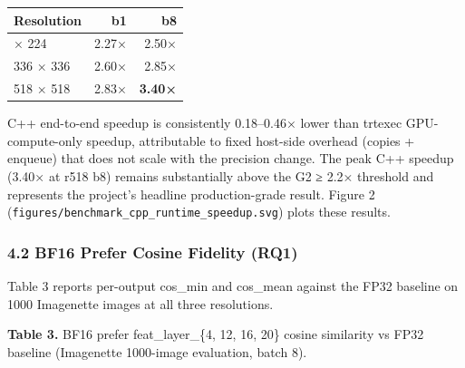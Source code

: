 \documentclass[
]{article}
\newcounter{none} %
\begin{document}
{\def\LTcaptype{none} %
\begin{longtable}[]{@{}lrr@{}}
\toprule\noalign{}
Resolution & b1 & b8 \\
\midrule\noalign{}
\endhead
\bottomrule\noalign{}
\endlastfoot
224 × 224 & 2.27× & 2.50× \\
336 × 336 & 2.60× & 2.85× \\
518 × 518 & 2.83× & \textbf{3.40×} \\
\end{longtable}
}

C++ end-to-end speedup is consistently 0.18--0.46× lower than trtexec
GPU-compute-only speedup, attributable to fixed host-side overhead
(copies + enqueue) that does not scale with the precision change. The
peak C++ speedup (3.40× at r518 b8) remains substantially above the G2 ≥
2.2× threshold and represents the project's headline production-grade
result. Figure 2 (\texttt{figures/benchmark\_cpp\_runtime\_speedup.svg})
plots these results.

\subsubsection{4.2 BF16 Prefer Cosine Fidelity
(RQ1)}\label{bf16-prefer-cosine-fidelity-rq1}

Table 3 reports per-output cos\_min and cos\_mean against the FP32
baseline on 1000 Imagenette images at all three resolutions.

\textbf{Table 3.} BF16 prefer feat\_layer\_\{4, 12, 16, 20\} cosine
similarity vs FP32 baseline (Imagenette 1000-image evaluation, batch 8).
\end{document}

